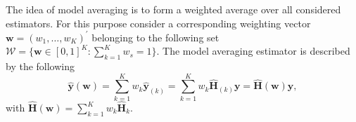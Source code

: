 The idea of model averaging is to form a weighted average over all considered estimators. For this purpose consider a corresponding weighting vector $ \boldsymbol w=\left(w_{1}, \ldots, w_{K}\right)^{\prime}$ belonging to the following set $\mathcal{W}=\{\boldsymbol{w} \in[0,1]^{K} : \sum_{k=1}^{K}w_{s}=1 \}$. The model averaging estimator is described by the following 
\begin{equation*}
\label{modelaveragingestimator}
\hat{ \boldsymbol y}(\boldsymbol w)=\sum_{k=1}^{K} w_{k} \hat{ \boldsymbol y}_{(k)}=\sum_{k=1}^{K} w_{k} \hat{ \boldsymbol H}_{(k)}  \boldsymbol y = \hat{ \boldsymbol H}( \boldsymbol w)  \boldsymbol y,
\end{equation*}
with $\hat{\boldsymbol H}(\boldsymbol w) = \sum_{k=1}^{K} w_{k} \hat{\boldsymbol H}_{k}$.


